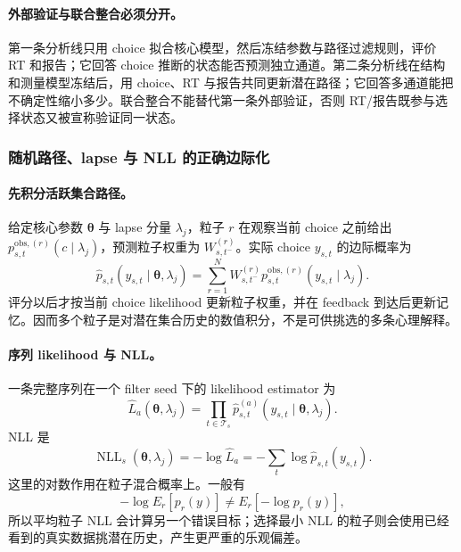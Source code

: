 \paragraph{外部验证与联合整合必须分开。}
第一条分析线只用 choice 拟合核心模型，然后冻结参数与路径过滤规则，评价 RT 和报告；它回答 choice 推断的状态能否预测独立通道。第二条分析线在结构和测量模型冻结后，用 choice、RT 与报告共同更新潜在路径；它回答多通道能把不确定性缩小多少。联合整合不能替代第一条外部验证，否则 RT/报告既参与选择状态又被宣称验证同一状态。


\subsubsection{随机路径、lapse 与 NLL 的正确边际化}

\paragraph{先积分活跃集合路径。}
给定核心参数 $\boldsymbol\theta$ 与 lapse 分量 $\lambda_j$，粒子 $r$ 在观察当前 choice 之前给出 $p^{\mathrm{obs},(r)}_{s,t}(c\mid\lambda_j)$，预测粒子权重为 $W^{(r)}_{s,t^-}$。实际 choice $y_{s,t}$ 的边际概率为
\begin{equation}
    \widehat p_{s,t}(y_{s,t}\mid\boldsymbol\theta,\lambda_j)
    =\sum_{r=1}^{N}W^{(r)}_{s,t^-}
      p^{\mathrm{obs},(r)}_{s,t}(y_{s,t}\mid\lambda_j).
    \label{eq:model0805-particle-marginal}
\end{equation}
评分以后才按当前 choice likelihood 更新粒子权重，并在 feedback 到达后更新记忆。因而多个粒子是对潜在集合历史的数值积分，不是可供挑选的多条心理解释。

\paragraph{序列 likelihood 与 NLL。}
一条完整序列在一个 filter seed 下的 likelihood estimator 为
\begin{equation}
    \widehat L_a(\boldsymbol\theta,\lambda_j)
    =\prod_{t\in\mathcal T_s}
      \widehat p^{(a)}_{s,t}(y_{s,t}\mid\boldsymbol\theta,\lambda_j).
    \label{eq:model0805-sequence-likelihood}
\end{equation}
NLL 是
\begin{equation}
    \operatorname{NLL}_s(\boldsymbol\theta,\lambda_j)
    =-\log\widehat L_a
    =-\sum_t\log\widehat p_{s,t}(y_{s,t}).
    \label{eq:model0805-nll}
\end{equation}
这里的对数作用在粒子混合概率上。一般有
\begin{equation}
    -\log E_r[p_r(y)]\neq E_r[-\log p_r(y)],
\end{equation}
所以平均粒子 NLL 会计算另一个错误目标；选择最小 NLL 的粒子则会使用已经看到的真实数据挑潜在历史，产生更严重的乐观偏差。

